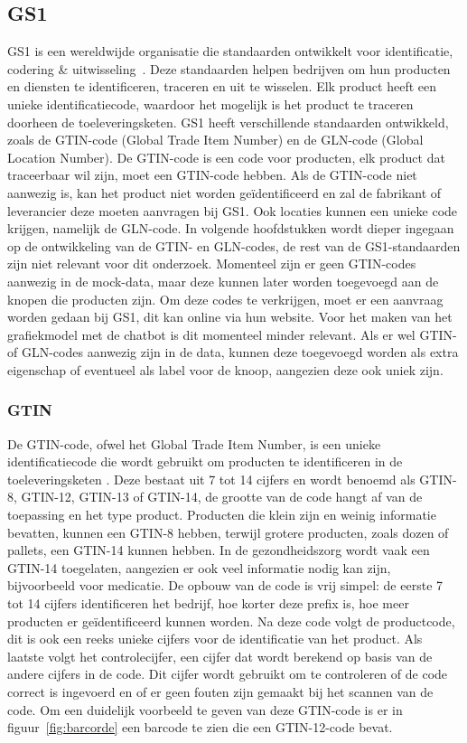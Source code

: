 \subsection{GS1}
GS1 is een wereldwijde organisatie die standaarden ontwikkelt voor identificatie, codering \& uitwisseling~\autocite{GS1standards}.
Deze standaarden helpen bedrijven om hun producten en diensten te identificeren, traceren en uit te wisselen.
Elk product heeft een unieke identificatiecode, waardoor het mogelijk is het product te traceren doorheen de toeleveringsketen.
GS1 heeft verschillende standaarden ontwikkeld, zoals de GTIN-code (Global Trade Item Number) en de GLN-code (Global Location Number).
De GTIN-code is een code voor producten, elk product dat traceerbaar wil zijn, moet een GTIN-code hebben.
Als de GTIN-code niet aanwezig is, kan het product niet worden geïdentificeerd en zal de fabrikant of leverancier deze moeten aanvragen bij GS1.
Ook locaties kunnen een unieke code krijgen, namelijk de GLN-code. In volgende hoofdstukken wordt dieper ingegaan op de ontwikkeling van de GTIN- en GLN-codes, de rest van de GS1-standaarden zijn niet relevant voor dit onderzoek.
Momenteel zijn er geen GTIN-codes aanwezig in de mock-data, maar deze kunnen later worden toegevoegd aan de knopen die producten zijn.
Om deze codes te verkrijgen, moet er een aanvraag worden gedaan bij GS1, dit kan online via hun website.
Voor het maken van het grafiekmodel met de chatbot is dit momenteel minder relevant.
Als er wel GTIN- of GLN-codes aanwezig zijn in de data, kunnen deze toegevoegd worden als extra eigenschap of eventueel als label voor de knoop, aangezien deze ook uniek zijn.

\subsubsection{GTIN}
De GTIN-code, ofwel het Global Trade Item Number, is een unieke identificatiecode die wordt gebruikt om producten te identificeren in de toeleveringsketen \autocite{GTIN2025}.
Deze bestaat uit 7 tot 14 cijfers en wordt benoemd als GTIN-8, GTIN-12, GTIN-13 of GTIN-14, de grootte van de code hangt af van de toepassing en het type product.
Producten die klein zijn en weinig informatie bevatten, kunnen een GTIN-8 hebben, terwijl grotere producten, zoals dozen of pallets, een GTIN-14 kunnen hebben.
In de gezondheidszorg wordt vaak een GTIN-14 toegelaten, aangezien er ook veel informatie nodig kan zijn, bijvoorbeeld voor medicatie.
De opbouw van de code is vrij simpel: de eerste 7 tot 14 cijfers identificeren het bedrijf, hoe korter deze prefix is, hoe meer producten er geïdentificeerd kunnen worden.
Na deze code volgt de productcode, dit is ook een reeks unieke cijfers voor de identificatie van het product.
Als laatste volgt het controlecijfer, een cijfer dat wordt berekend op basis van de andere cijfers in de code.
Dit cijfer wordt gebruikt om te controleren of de code correct is ingevoerd en of er geen fouten zijn gemaakt bij het scannen van de code.
Om een duidelijk voorbeeld te geven van deze GTIN-code is er in figuur~\ref{fig:barcorde} een barcode te zien die een GTIN-12-code bevat.

